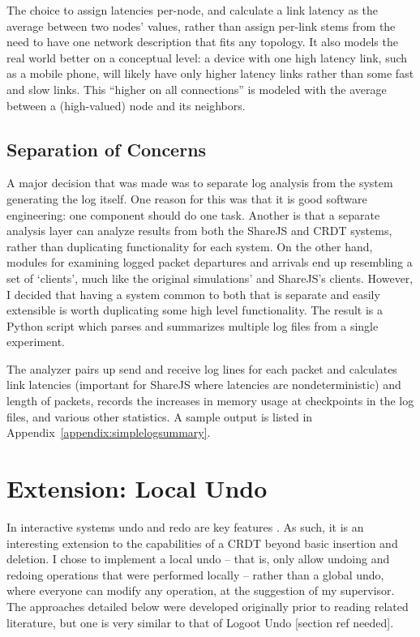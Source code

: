 \documentclass[12pt,a4paper,twoside,openright]{report}
\begin{document}
	The choice to assign latencies per-node, and calculate a link latency as the average between two nodes' values, rather than assign per-link stems from the need to have one network description that fits any topology. It also models the real world better on a conceptual level: a device with one high latency link, such as a mobile phone, will likely have only higher latency links rather than some fast and slow links. This ``higher on all connections'' is modeled with the average between a (high-valued) node and its neighbors.

	
	\subsection{Separation of Concerns}
	
	A major decision that was made was to separate log analysis from the system generating the log itself. One reason for this was that it is good software engineering: one component should do one task. Another is that a separate analysis layer can analyze results from both the ShareJS and CRDT systems, rather than duplicating functionality for each system. On the other hand, modules for examining logged packet departures and arrivals end up resembling a set of `clients', much like the original simulations' and ShareJS's clients. However, I decided that having a system common to both that is separate and easily extensible is worth duplicating some high level functionality. The result is a Python script which parses and summarizes multiple log files from a single experiment.
	
	The analyzer pairs up send and receive log lines for each packet and calculates link latencies (important for ShareJS where latencies are nondeterministic) and length of packets, records the increases in memory usage at checkpoints in the log files, and various other statistics. A sample output is listed in Appendix~\ref{appendix:simplelogsummary}.	
	
	
	
\section{Extension: Local Undo}
	
	In interactive systems undo and redo are key features \cite{shneiderman1982}. As such, it is an interesting extension to the capabilities of a CRDT beyond basic insertion and deletion. I chose to implement a local undo -- that is, only allow undoing and redoing operations that were performed locally -- rather than a global undo, where everyone can modify any operation, at the suggestion of my supervisor. The approaches detailed below were developed originally prior to reading related literature, but one is very similar to that of Logoot Undo [section ref needed].
	
\end{document}

